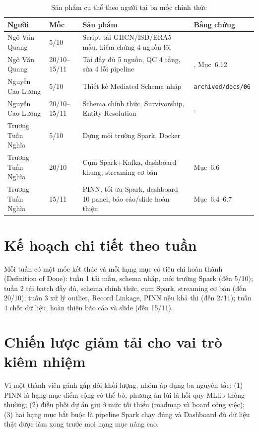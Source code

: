 \documentclass[12pt,a4paper]{report}
\begin{document}
\begin{table}[H]
\centering\footnotesize
\caption{Sản phẩm cụ thể theo người tại ba mốc chính thức}
\label{tab:team-progress}
\begin{tabular}{@{}L{2.6cm}L{1.3cm}L{6.3cm}L{3.2cm}@{}}
\toprule
\textbf{Người} & \textbf{Mốc} & \textbf{Sản phẩm} & \textbf{Bằng chứng} \\
\midrule
Ngô Văn Quang & 5/10 & Script tải GHCN/ISD/ERA5 mẫu, kiểm chứng 4 nguồn lõi &  \\
Ngô Văn Quang & 20/10--15/11 & Tải đầy đủ 5 nguồn, QC 4 tầng, sửa 4 lỗi pipeline & , Mục~6.12 \\
Nguyễn Cao Lương & 5/10 & Thiết kế Mediated Schema nháp & \texttt{archived/docs/06} \\
Nguyễn Cao Lương & 20/10--15/11 & Schema chính thức, Survivorship, Entity Resolution & ,  \\
Trương Tuấn Nghĩa & 5/10 & Dựng môi trường Spark, Docker &  \\
Trương Tuấn Nghĩa & 20/10 & Cụm Spark+Kafka, dashboard khung, streaming cơ bản & Mục~6.6 \\
Trương Tuấn Nghĩa & 15/11 & PINN, tối ưu Spark, dashboard 10 panel, báo cáo/slide hoàn thiện & Mục~6.4--6.7 \\
\bottomrule
\end{tabular}
\end{table}

\section{Kế hoạch chi tiết theo tuần}

Mỗi tuần có một mốc kết thúc và mỗi hạng mục có tiêu chí hoàn thành (Definition of Done): tuần 1
tải mẫu, schema nháp, môi trường Spark (đến 5/10); tuần 2 tải batch đầy đủ, schema chính thức, cụm
Spark, streaming cơ bản (đến 20/10); tuần 3 xử lý outlier, Record Linkage, PINN nếu khả thi (đến 2/11);
tuần 4 chốt dữ liệu, hoàn thiện báo cáo và slide (đến 15/11).

\section{Chiến lược giảm tải cho vai trò kiêm nhiệm}

Vì một thành viên gánh gấp đôi khối lượng, nhóm áp dụng ba nguyên tắc: (1) PINN là hạng mục điểm
cộng có thể bỏ, phương án lùi là hồi quy MLlib thông thường; (2) điều phối dự án giữ ở mức tối thiểu
(roadmap và board công việc); (3) hai hạng mục bắt buộc là pipeline Spark chạy đúng và Dashboard đủ dữ
liệu thật được làm xong trước mọi hạng mục nâng cao.
\end{document}
